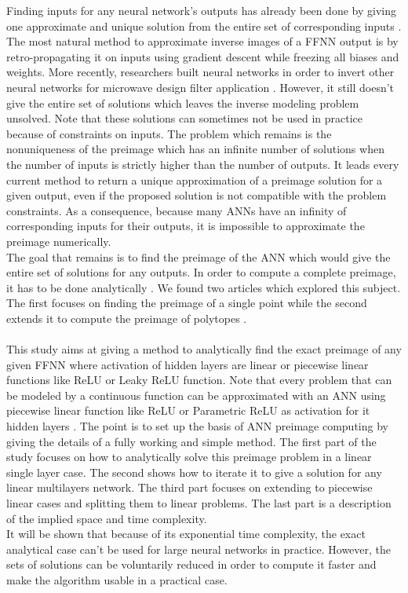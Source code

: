 \documentclass{article}
\begin{document}
Finding inputs for any neural network’s outputs has already been done by giving one approximate and unique solution from the entire set of
corresponding inputs \cite{dua2000inversion}.\\
The most natural method to approximate inverse images of a FFNN output is by retro-propagating it on inputs using gradient descent while
freezing all biases and weights. More recently, researchers built neural networks
in order to invert other neural networks for microwave design filter application
\cite{kabir2008neural}. However, it still doesn’t give the entire set of solutions which leaves the
inverse modeling problem unsolved. Note that these solutions can sometimes
not be used in practice because of constraints on inputs. The problem which
remains is the nonuniqueness of the preimage which has an infinite number
of solutions when the number of inputs is strictly higher than the number of
outputs. It leads every current method to return a unique approximation of a preimage solution for a given output, 
even if the proposed solution is not compatible
with the problem constraints. As a consequence, because many ANNs have an infinity of corresponding inputs for their 
outputs, it is impossible to approximate the preimage numerically.\\
The goal that remains is to find the preimage of the ANN which would give the
entire set of solutions for any outputs. In order to compute a complete preimage, it has to be done analytically . We found two
articles which explored this subject. The first focuses on finding the preimage
of a single point \cite{carlsson2016preimage} while the second extends it to compute the preimage of polytopes
\cite{matoba2020computing}.\\\\

This study aims at giving a method to analytically find the exact preimage of any given
FFNN where activation of hidden layers are linear or piecewise linear functions
like ReLU or Leaky ReLU function. Note that every problem that can be modeled by a continuous function can be 
approximated with an ANN using piecewise linear function like ReLU or Parametric ReLU as activation for it hidden layers \cite{hanin2017approximating}.
The point is to set up the basis of ANN preimage computing by giving the details of a fully working and simple method.
The first part of the study focuses on how to analytically solve this preimage problem in a linear single layer case. 
The second shows how to iterate it to give a solution for any linear multilayers network. The third part focuses
on extending to piecewise linear cases and splitting them to linear problems.
The last part is a description of the implied space and time complexity.\\
It will be shown that because of its exponential time complexity, the exact analytical case can’t be used 
for large neural networks in practice. However, the sets of solutions can be voluntarily reduced in order to compute it 
faster and make the algorithm usable in a practical case.
\newpage
\end{document}
